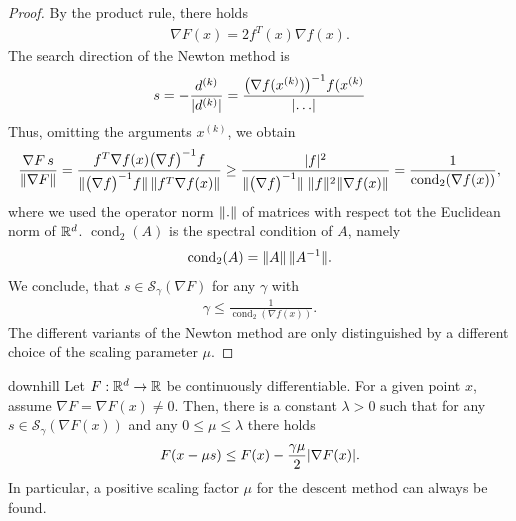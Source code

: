 \begin{proof}
  By the product rule, there holds
  \begin{gather*}
    \nabla F(x) = 2 f^T(x) \nabla f(x).
  \end{gather*}
  The search direction of the Newton method is
  \begin{gather*}
    s = -\frac{d^{(k)}}{\lvert d^{(k)}\rvert}
    = \frac{\bigl(\nabla f(x^{(k)})\bigr)^{-1}f(x^{(k)}}{\lvert\dots\rvert}
  \end{gather*}
  Thus, omitting the arguments $x^{(k)}$, we obtain
  \begin{gather*}
    \frac{\nabla F\, s}{\norm{\nabla F}}
    = \frac{f^T \nabla f(x)\bigl(\nabla f\bigr)^{-1} f}%
    {\norm{\bigl(\nabla f\bigr)^{-1} f}\,\norm{f^T \nabla f(x)}}
    \ge \frac{\abs{f}^2}{\norm{\bigl(\nabla f\bigr)^{-1}}\;
      \norm{f}^2 \norm{\nabla f(x)} }
    = \frac1{\operatorname{cond}_2 (\nabla f(x))},
  \end{gather*}
  where we used the operator norm $\lVert.\rVert$ of matrices with respect
  tot the Euclidean norm of $\mathbb R^d$. $\operatorname{cond}_2(A)$ is the
  spectral condition of $A$, namely
  \begin{gather*}
    \operatorname{cond}_2(A) = \lVert A\rVert \, \lVert A^{-1}\rVert.
  \end{gather*}
  We conclude, that $s\in \mathcal S_\gamma(\nabla F)$ for any
  $\gamma$ with
  \begin{gather*}
    \gamma \le \frac1{\operatorname{cond}_2 (\nabla f(x))}.
  \end{gather*}
  The different variants of the Newton method are only distinguished by
  a different choice of the scaling parameter $\mu$.
\end{proof}

\begin{Lemma}{downhill}
  Let $F: \mathbb R^d \to \mathbb R$ be continuously differentiable. For a given
  point $x$, assume $\nabla F = \nabla F(x) \neq 0$.  Then, there is a
  constant $\lambda > 0$ such that for any
  $s\in \mathcal S_\gamma(\nabla F(x))$ and any
  $0 \le \mu \le \lambda$ there holds
  \begin{gather}
    \label{eq:downhill:1}
    F(x-\mu s) \le F(x) - \frac{\gamma\mu}2 \lvert\nabla F(x)\rvert.
  \end{gather}
  In particular, a positive scaling factor $\mu$ for the descent method can
  always be found.
\end{Lemma}

